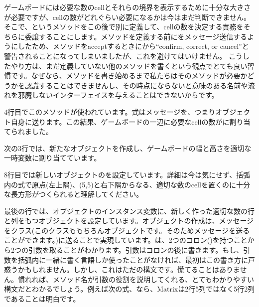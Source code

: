 \documentclass[a4paper,10pt,twoside]{book}
\begin{document}
ゲームボードには必要な数のcellとそれらの境界を表示するために十分な大きさが必要ですが、cellの数がどれぐらい必要になるかは今はまだ判断できません。そこで、というメソッドをこの後で別に定義して、cellの数を決定する責務をそちらに委譲することにします。メソッドを定義する前にをメッセージ送信するようにしたため、メソッドをacceptするときに\pharo から``confirm, correct, or cancel''と警告されることになってしまいましたが、これを避けてはいけません。
こうしたやり方は、まだ定義していない他のメソッドを書くという観点でとても良い習慣です。なぜなら、メソッドを書き始めるまで私たちはそのメソッドが必要かどうかを認識することはできませんし、その時点にならないと意味のある名前や流れを邪魔しないインターフェイスを与えることはできないからです。

4行目でこのメソッドが使われています。\st 式はメッセージを、つまりオブジェクト自身に送ります。この結果、ゲームボードの一辺に必要なcellの数がに割り当てられました。

次の3行では、新たなオブジェクトを作成し、ゲームボードの幅と高さを適切な一時変数に割り当てています。

8行目では新しいオブジェクトのを設定しています。詳細は今は気にせず、括弧内の式で原点(\ie 左上隅)、(5,5)と右下隅からなる、適切な数のcellを置くのに十分な長方形がつくられると理解してください。

最後の行では、オブジェクトのインスタンス変数に、新しく作った適切な数の行と列をもつオブジェクトを設定しています。オブジェクトの作成は、メッセージをクラス(このクラスももちろんオブジェクトです。そのためメッセージを送ることができます。)に送ることで実現しています。は、2つのコロン(\ct{:})を持つことから2つの引数を取ることがわかります。引数はコロンの後に書きます。もし、引数を括弧内に一緒に書く言語しか使ったことがなければ、最初はこの書き方に戸惑うかもしれません。しかし、これはただの構文です。慌てることはありません。慣れれば、メソッド名が引数の役割を説明してくれる、とてもわかりやすい構文だとわかるでしょう。例えば次の式、なら、Matrixは2行5列ではなく5行2列であることは明白です。
\end{document}
